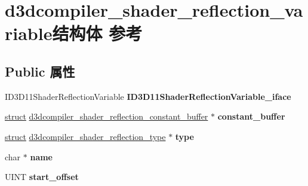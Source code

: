 \hypertarget{structd3dcompiler__shader__reflection__variable}{}\section{d3dcompiler\+\_\+shader\+\_\+reflection\+\_\+variable结构体 参考}
\label{structd3dcompiler__shader__reflection__variable}
\subsection*{Public 属性}
\begin{DoxyCompactItemize}
\item 
\mbox{\label{structd3dcompiler__shader__reflection__variable_a894a88a9e2d8964ccfb7fb3c7cfb9cca}} 
I\+D3\+D11\+Shader\+Reflection\+Variable {\bfseries I\+D3\+D11\+Shader\+Reflection\+Variable\+\_\+iface}
\item 
\mbox{\label{structd3dcompiler__shader__reflection__variable_a419ce4f02e82e7d37f19e633a8997d6d}} 
\hyperlink{interfacestruct}{struct} \hyperlink{structd3dcompiler__shader__reflection__constant__buffer}{d3dcompiler\+\_\+shader\+\_\+reflection\+\_\+constant\+\_\+buffer} $\ast$ {\bfseries constant\+\_\+buffer}
\item 
\mbox{\label{structd3dcompiler__shader__reflection__variable_a9e0d6dfaa8d914aeb384ef5005f6d512}} 
\hyperlink{interfacestruct}{struct} \hyperlink{structd3dcompiler__shader__reflection__type}{d3dcompiler\+\_\+shader\+\_\+reflection\+\_\+type} $\ast$ {\bfseries type}
\item 
\mbox{\label{structd3dcompiler__shader__reflection__variable_adc21e52e79d20209e1aad67ecd5ed089}} 
char $\ast$ {\bfseries name}
\item 
\mbox{\label{structd3dcompiler__shader__reflection__variable_ae6135830ca3a449319d7548f7cac24b3}} 
U\+I\+NT {\bfseries start\+\_\+offset}
\item 
\mbox{\label{structd3dcompiler__shader__reflection__variable_a39d1c2cc052b8ce83570469b4330e303}} 

\end{DoxyCompactItemize}
